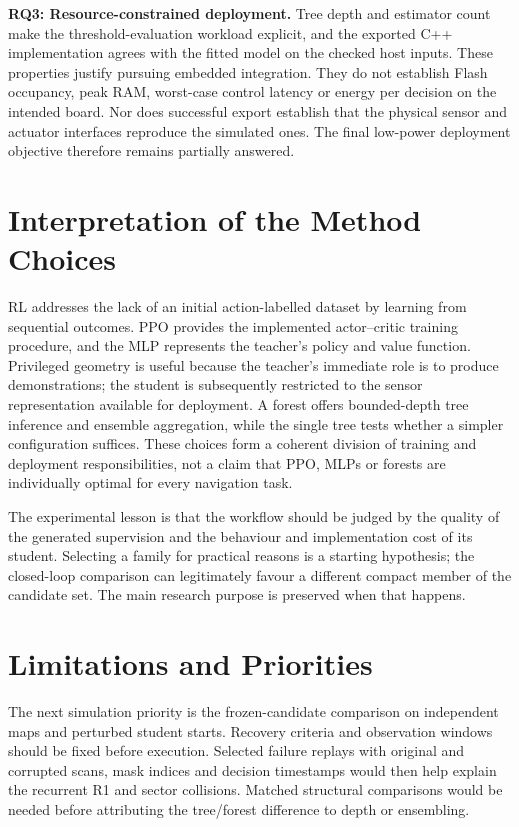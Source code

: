 \textbf{RQ3: Resource-constrained deployment.}
Tree depth and estimator count make the threshold-evaluation workload explicit,
and the exported C++ implementation agrees with the fitted model on the checked
host inputs. These properties justify pursuing embedded integration. They do
not establish Flash occupancy, peak RAM, worst-case control latency or energy
per decision on the intended board. Nor does successful export establish that
the physical sensor and actuator interfaces reproduce the simulated ones.
The final low-power deployment objective therefore remains partially answered.

\section{Interpretation of the Method Choices}
RL addresses the lack of an initial action-labelled dataset by learning from
sequential outcomes. PPO provides the implemented actor--critic training
procedure, and the MLP represents the teacher's policy and value function.
Privileged geometry is useful because the teacher's immediate role is to
produce demonstrations; the student is subsequently restricted to the sensor
representation available for deployment. A forest offers bounded-depth tree
inference and ensemble aggregation, while the single tree tests whether a
simpler configuration suffices. These choices form a coherent division of
training and deployment responsibilities, not a claim that PPO, MLPs or forests
are individually optimal for every navigation task.

The experimental lesson is that the workflow should be judged by the quality
of the generated supervision and the behaviour and implementation cost of its
student. Selecting a family for practical reasons is a starting hypothesis;
the closed-loop comparison can legitimately favour a different compact member
of the candidate set. The main research purpose is preserved when that happens.

\section{Limitations and Priorities}
The next simulation priority is the frozen-candidate comparison on independent
maps and perturbed student starts. Recovery criteria and observation windows
should be fixed before execution. Selected failure replays with original and
corrupted scans, mask indices and decision timestamps would then help explain
the recurrent R1 and sector collisions. Matched structural comparisons would
be needed before attributing the tree/forest difference to depth or ensembling.

